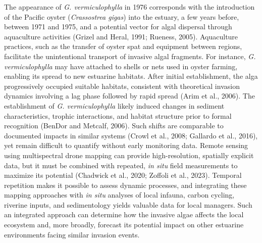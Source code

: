 \documentclass[
  letterpaper,
  DIV=11,
  numbers=noendperiod]{scrartcl}
\begin{document}
The appearance of \emph{G. vermiculophylla} in 1976 corresponds with the
introduction of the Pacific oyster (\emph{Crassostrea gigas}) into the
estuary, a few years before, between 1971 and 1975, and a potential
vector for algal dispersal through aquaculture activities (Grizel and
Heral, 1991; Rueness, 2005). Aquaculture practices, such as the transfer
of oyster spat and equipment between regions, facilitate the
unintentional transport of invasive algal fragments. For instance,
\emph{G. vermiculophylla} may have attached to shells or nets used in
oyster farming, enabling its spread to new estuarine habitats. After
initial establishment, the alga progressively occupied suitable
habitats, consistent with theoretical invasion dynamics involving a lag
phase followed by rapid spread (Arim et al., 2006). The establishment of
\emph{G. vermiculophylla} likely induced changes in sediment
characteristics, trophic interactions, and habitat structure prior to
formal recognition (BenDor and Metcalf, 2006). Such shifts are
comparable to documented impacts in similar systems (Crowl et al., 2008;
Gallardo et al., 2016), yet remain difficult to quantify without early
monitoring data. Remote sensing using multispectral drone mapping can
provide high-resolution, spatially explicit data, but it must be
combined with repeated, \emph{in situ} field measurements to maximize
its potential (Chadwick et al., 2020; Zoffoli et al., 2023). Temporal
repetition makes it possible to assess dynamic processes, and
integrating these mapping approaches with \emph{in situ} analyses of
local infauna, carbon cycling, riverine inputs, and sedimentology yields
valuable data for local managers. Such an integrated approach can
determine how the invasive algae affects the local ecosystem and, more
broadly, forecast its potential impact on other estuarine environments
facing similar invasion events.
\end{document}

